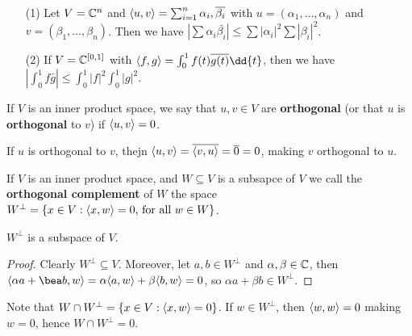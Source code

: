 \begin{example}
    \begin{enumerate}
        \item[(1)] Let $V=\mathbb{C}^n$ and  $\langle u,v\rangle=\sum_{i=1}^n{\alpha_i,\overline{\beta_i}}$ with
            $u=(\alpha_1, \dots, \alpha_n)$ and $v=(\beta_1, \dots, \beta_n)$. Then we have
            $|\sum{\alpha_i\bar{\beta_i}}| \leq \sum{|\alpha_i|^2}\sum{|\beta_i|^2}$.		

        \item[(2)] If $V=\mathbb{C}^{[0,1]}$ with $\vbrack{f,g}=\int_{0}^1{f(t)\bar{g(t)}} \dd{t}$, then we
            have $|\int_{0}^1{f\bar{g}}| \leq \int_{0}^1{|f|^2}\int_{0}^1{|g|^2}$.
    \end{enumerate}
\end{example} 

\begin{definition}
    If $V$ is an inner product space, we say that $u, v \in V$ are \textbf{orthogonal} (or that $u$
    is  \textbf{orthogonal} to $v$) if $\langle u,v\rangle=0$.
\end{definition}

\begin{example}
    If $u$ is orthogonal to  $v$, thejn  $\langle u,v\rangle=\overline{\langle v,u\rangle}=\overline{0}=0$, making $v$
    orthogonal to $u$.
\end{example} 

\begin{definition}
    If $V$ is an inner product space, and  $W \subseteq V$ is a subsapce of  $V$ we call the
    \textbf{orthogonal complement} of $W$ the space  $W^\perp=\{x \in V: \langle x,w\rangle=0 \text{, for
    all } w \in W\}$.
\end{definition}

\begin{lemma}
    $W^\perp$ is a subspace of  $V$.
\end{lemma}
\begin{proof}
    Clearly $W^\perp \subseteq V$. Moreover, let $a,b \in W^\perp$ and  $\alpha,\beta \in \mathbb{C}$, then
     $\vbrack{\alpha a+\bea b, w}=\alpha\vbrack{a,w}+\beta\vbrack{b,w}=0$, so $\alpha a+\beta b \in
     W^\perp$.
\end{proof}

\begin{example}
    Note that $W \cap W^\perp=\{x \in V: \langle x,w\rangle=0\}$. If $w \in W^\perp$, then $\langle w,w\rangle=0$
    making $w=0$, hence  $W \cap W^\perp=0$.
\end{example} 

